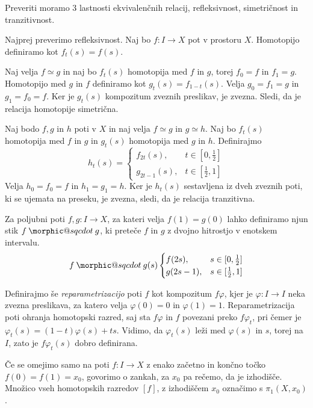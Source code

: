 \documentclass[mat1]{fmfdelo}
\makeatletter
\DeclareRobustCommand{\sqcdot}{\mathbin{\mathpalette\morphic@sqcdot\relax}}
\newcommand{\morphic@sqcdot}[2]{%
\sbox\z@{$\m@th#1\centerdot$}%
\ht\z@=.33333\ht\z@
\vcenter{\box\z@}%
}
\makeatother
\begin{document}
\begin{dokaz}
    Preveriti moramo 3 lastnosti ekvivalenčnih relacij, refleksivnost, simetričnost in tranzitivnost.

    Najprej preverimo refleksivnost. Naj bo $f : I \rightarrow X$ pot v prostoru $X$. Homotopijo definiramo kot $f_t(s)=f(s)$.
    
    Naj velja $f \simeq g$ in naj bo $f_t(s)$ homotopija med $f$ in $g$, 
    torej $f_0=f$ in $f_1=g$. Homotopijo med $g$ in $f$ definiramo kot 
    $g_t(s)=f_{1-t}(s)$. Velja $g_0=f_1=g$ in $g_1=f_0=f$. Ker je 
    $g_t(s)$ kompozitum zveznih preslikav, je zvezna. Sledi, da je 
    relacija homotopije simetrična.
    
    Naj bodo $f, g \text{ in } h$ poti v $X$ in naj velja $f \simeq g$ 
    in $g \simeq h$. Naj bo $f_t(s)$ homotopija med $f$ in $g$ in 
    $g_t(s)$ homotopija med $g$ in $h$. Definirajmo 
    $$h_t(s)=\begin{cases}
        f_{2t}(s), & t \in [0,\frac{1}{2}] \\
        g_{2t-1}(s), & t \in [\frac{1}{2},1]
    \end{cases}
    $$
    Velja $h_0=f_0=f$ in $h_1=g_1=h$. Ker je $h_t(s)$ sestavljena iz dveh zveznih poti, ki se ujemata na preseku, je zvezna, sledi, da je relacija tranzitivna.
\end{dokaz}

Za poljubni poti $f,g : I \rightarrow X$, za kateri velja $f(1) = g(0)$ 
lahko definiramo njun stik $f\sqcdot g$, ki preteče $f$ in $g$ z dvojno 
hitrostjo v enotskem intervalu.
$$ f\sqcdot g(s) \begin{cases}
    f(2s), &s \in [0,\frac{1}{2}] \\
    g(2s-1), & s \in [\frac{1}{2},1]
\end{cases}
$$

    Definirajmo še \textit{reparametrizacijo} poti $f$ kot kompozitum $f 
    \varphi$, kjer je $\varphi: I \rightarrow I$ neka zvezna preslikava, za 
    katero velja $\varphi(0)= 0$ in $\varphi(1)=1$. Reparametrizacija poti 
    ohranja homotopski razred, saj sta $f\varphi$ in $f$ povezani preko 
    $f\varphi_t$, pri čemer je $\varphi_t(s)=(1-t)\varphi(s)+ts$. Vidimo, da 
    $\varphi_t(s)$ leži med $\varphi(s)$ in $s$, torej na $I$, zato je 
    $f\varphi_t(s)$ dobro definirana.

Če se omejimo samo na poti $f:I \rightarrow X$ z enako začetno in končno točko $f(0) = f(1) = x_0$, govorimo o zankah, za $x_0$ pa rečemo, da je izhodišče.
Množico vseh homotopskih razredov $[f]$, z izhodiščem $x_0$ označimo s $\pi_1(X,x_0)$.
\end{document}

